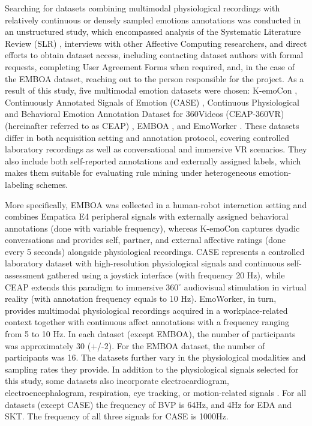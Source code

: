 \documentclass{isd}
\begin{document}
{Searching for datasets combining multimodal physiological recordings with relatively continuous or densely sampled emotions annotations was conducted in an unstructured study, which encompassed analysis of the Systematic Literature Review (SLR) \cite{ometov2025stress, 11214492, app14167165}, interviews with other Affective Computing researchers, and direct efforts to obtain dataset access, including contacting dataset authors with formal requests, completing User Agreement Forms when required, and, in the case of the EMBOA dataset, reaching out to the person responsible for the project.
As a result of this study, five multimodal emotion datasets were chosen: K-emoCon \cite{park2020k}, Continuously Annotated Signals of Emotion (CASE) \cite{sharma2019dataset}, Continuous Physiological and
Behavioral Emotion Annotation Dataset for 360\degree Videos (CEAP-360VR) (hereinafter referred to as CEAP) \cite{xue2021ceap}, EMBOA \cite{barkan2024challenges}, and EmoWorker \cite{lee2026multimodal}. These datasets differ in both acquisition setting and annotation protocol, covering controlled laboratory recordings as well as conversational and immersive VR scenarios. They also include both self-reported annotations and externally assigned labels, which makes them suitable for evaluating rule mining under heterogeneous emotion-labeling schemes.

More specifically, EMBOA was collected in a human-robot interaction setting and combines Empatica E4 peripheral signals with externally assigned behavioral annotations (done with variable frequency), whereas K-emoCon captures dyadic conversations and provides self, partner, and external affective ratings (done every 5 seconds) alongside physiological recordings. CASE represents a controlled laboratory dataset with high-resolution physiological signals and continuous self-assessment gathered using a joystick interface (with frequency 20 Hz), while CEAP extends this paradigm to immersive \(360^\circ\) audiovisual stimulation in virtual reality \cite{xue2021ceap} (with annotation frequency equals to 10 Hz). EmoWorker, in turn, provides multimodal physiological recordings acquired in a workplace-related context together with continuous affect annotations \cite{lee2026multimodal} with a frequency ranging from 5 to 10 Hz.
In each dataset (except EMBOA), the number of participants was approximately 30 (+/-2). For the EMBOA dataset, the number of participants was 16.
The datasets further vary in the physiological modalities and sampling rates they provide. In addition to the physiological signals selected for this study, some datasets also incorporate electrocardiogram, electroencephalogram, respiration, eye tracking, or motion-related signals \cite{park2020k,sharma2019dataset,xue2021ceap,lee2026multimodal}. For all datasets (except CASE) the frequency of BVP is 64Hz, and 4Hz for EDA and SKT. The frequency of all three signals for CASE is 1000Hz. 

}
\end{document}
